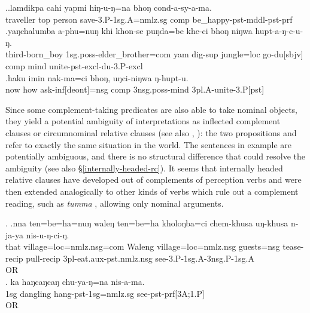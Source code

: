  
\ex.\ag.lamdikpa  cahi yapmi  hiŋ-u-ŋ=na       bhoŋ cond-a-sy-a-ma.\\
traveller {\sc top} person save{\sc [pst]-3.P-1sg.A=nmlz.sg} {\sc comp} be\_happy{\sc [3sg]-pst-mddl-pst-prf}\\
 
\bg.yaŋchalumba   a-phu=nuŋ                      khi khon-se         puŋda=be    khe-ci   bhoŋ niŋwa hupt-a-ŋ-c-u-ŋ.\\
third-born\_boy {\sc 1sg.poss-}elder\_brother{\sc =com} yam dig{\sc -sup} jungle{\sc =loc} go{\sc -du[sbjv]} {\sc comp} mind unite{\sc -pst-excl-du-3.P-excl}\\
\bg.haku imin nak-ma=ci                  bhoŋ, uŋci-niŋwa       ŋ-hupt-u.\\
now how ask{\sc -inf[deont]=nsg} {\sc comp} {\sc 3nsg.poss-}mind {\sc 3pl.A-}unite{\sc -3.P[pst]}\\
 


Since some complement-taking predicates are also able to take nominal objects,  they yield a potential ambiguity of interpretations as inflected  complement clauses or circumnominal relative clauses (see also \citet[272]{Bickel1999Nominalization}, \citet[120,143]{Noonan2007Complementation}): the two propositions  and  refer to exactly the same situation in the world. The sentences in example \Next are potentially ambiguous, and there is no structural difference that could resolve the ambiguity (see also §\ref{internally-headed-rc}). It seems that internally headed relative clauses have developed out of complements of perception verbs and were then extended analogically to other kinds of verbs which rule out a complement reading, such as \emph{tumma} , allowing only nominal arguments.

\ex. \ag.nna  ten=be=ha=nuŋ waleŋ    ten=be=ha    kholoŋba=ci    chem-khusa    uŋ-khusa    n-ja-ya    nis-u-ŋ-ci-ŋ.\\
that village{\sc =loc=nmlz.nsg=com} Waleng village{\sc =loc=nmlz.nsg} guests{\sc =nsg} tease{\sc -recip} pull{\sc -recip} {\sc 3pl-eat.aux-pst.nmlz.nsg} see{\sc [pst]-3.P-1sg.A-3nsg.P-1sg.A}\\
 OR\\
 
\bg.  ka  haŋcaŋcaŋ chu-ya-ŋ=na                  nis-a-ma.\\
{\sc 1sg} dangling hang{\sc -pst-1sg=nmlz.sg} see{\sc -pst-prf[3A;1.P]}\\
 OR \\
 


